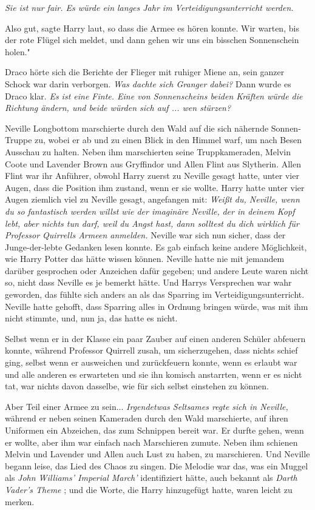 \emph{Sie ist nur fair. Es würde ein langes Jahr im Verteidigungsunterricht werden.}

\glqq Also gut\grqq{}, sagte Harry laut, so dass die Armee es hören konnte.
\glqq Wir warten, bis der rote Flügel sich meldet, und dann gehen wir uns ein
bisschen Sonnenschein holen."

Draco hörte sich die Berichte der Flieger mit ruhiger Miene an, sein ganzer
Schock war darin verborgen.
\emph{ Was dachte sich Granger dabei? }
Dann wurde es Draco klar.
\emph{Es ist eine Finte. Eine von Sonnenscheins beiden Kräften würde die Richtung ändern, und beide würden sich auf ... wen stürzen? }


Neville Longbottom marschierte durch den Wald auf die sich nähernde
Sonnen-Truppe zu, wobei er ab und zu einen Blick in den Himmel warf, um nach
Besen Ausschau zu halten. Neben ihm marschierten seine Truppkameraden, Melvin
Coote und Lavender Brown aus Gryffindor und Allen Flint aus Slytherin. Allen
Flint war ihr Anführer, obwohl Harry zuerst zu Neville gesagt hatte, unter vier
Augen, dass die Position ihm zustand, wenn er sie wollte. Harry hatte unter vier
Augen ziemlich viel zu Neville gesagt, angefangen mit: \glqq \emph{Weißt du,
Neville, wenn du so fantastisch werden willst wie der imaginäre Neville,
}\emph{der in deinem Kopf lebt, aber nichts tun darf, weil du Angst hast, dann
solltest du dich wirklich für Professor Quirrells Armeen anmelden.\grqq{} }
Neville war sich nun sicher, dass der Junge-der-lebte Gedanken lesen konnte. Es
gab einfach keine andere Möglichkeit, wie Harry Potter das hätte wissen können.
Neville hatte nie mit jemandem darüber gesprochen oder Anzeichen dafür gegeben;
und andere Leute waren nicht so, nicht dass Neville es je bemerkt hätte. Und
Harrys Versprechen war wahr geworden, das fühlte sich anders an als das Sparring
im Verteidigungsunterricht. Neville hatte gehofft, dass Sparring alles in
Ordnung bringen würde, was mit ihm nicht stimmte, und, nun ja, das hatte es
nicht.

Selbst wenn er in der Klasse ein paar Zauber auf einen anderen Schüler abfeuern
konnte, während Professor Quirrell zusah, um sicherzugehen, dass nichts schief
ging, selbst wenn er ausweichen und zurückfeuern konnte, wenn es erlaubt war und
alle anderen es erwarteten und sie ihn komisch anstarrten, wenn er es nicht tat,
war nichts davon dasselbe, wie für sich selbst einstehen zu können.

Aber Teil einer Armee zu sein... \emph{Irgendetwas Seltsames regte sich in
Neville,} während er neben seinen Kameraden durch den Wald marschierte, auf
ihren Uniformen ein Abzeichen, das zum Schnippen bereit war. Er durfte gehen,
wenn er wollte, aber ihm war einfach nach Marschieren zumute. Neben ihm schienen
Melvin und Lavender und Allen auch Lust zu haben, zu marschieren. Und Neville
begann leise, das Lied des Chaos zu singen. Die Melodie war das, was ein Muggel
als \emph{John Williams' Imperial March'} identifiziert hätte, auch bekannt als
\emph{\glqq Darth Vader's Theme\grqq{} }; und die Worte, die Harry hinzugefügt
hatte, waren leicht zu merken.

